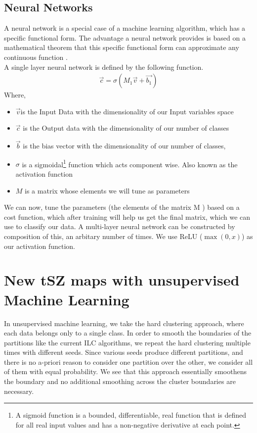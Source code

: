 \subsection{Neural Networks}
A neural network is a special case of a machine learning algorithm, which has a specific functional form.
The advantage a neural network provides is based on a mathematical theorem that this specific functional form can
approximate any continuous function \cite{univapproxtheorem}.\\
A single layer neural network is defined by the following function.
\begin{align}
    \vec{c} = \sigma(M_1 \vec{v} + \vec{b_1})
\end{align}
Where, 
\begin{itemize}
\item $\vec{v}$is the Input Data with the dimensionality of our Input variables space
\item $\vec{c}$ is the Output data with the dimensionality of our number of classes
\item $\vec{b}$ is the bias vector with the dimensionality of our number of classes,
\item $\sigma$ is a sigmoidal\footnote{  A sigmoid function is a bounded, differentiable,
    real function that is defined for all real input values and has a non-negative derivative
    at each point. } function which acts component wise. Also known as the activation function
\item $M$ is a matrix whose elements we will tune as parameters
\end{itemize}
We can now, tune the parameters (the elements of the matrix M ) based on a cost function, which after training will
help us get the final matrix, which we can use to classify our data. A multi-layer neural network can be constructed by
composition of this, an arbitary number of times. We use ReLU ($\max(0, x)$) as our activation function. 


\section{New tSZ maps with unsupervised Machine Learning}
\label{tSZmaps}
In unsupervised machine learning, we take the hard clustering approach,
where each data belongs only to a single class. In order to smooth the boundaries of the partitions
like the current ILC algorithms, we repeat the hard clustering multiple times with different seeds.
Since various seeds produce different partitions, and there is no a-priori reason to consider one
partition over the other, we consider all of them with equal probability. We see that this approach
essentially smoothens the boundary and no additional smoothing across the cluster boundaries are
necessary. 

